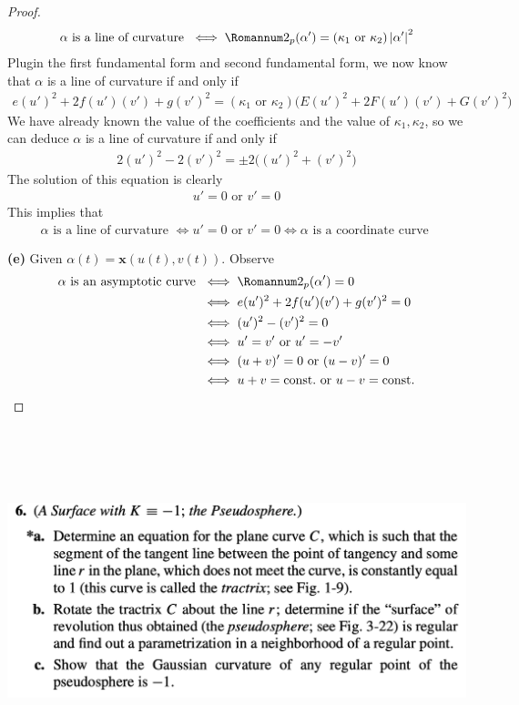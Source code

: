 \documentclass{report}
\begin{document}
\begin{proof}
\begin{align*}
\alpha \text{ is a line of  curvature }\iff \Sec_p(\alpha ')= (\kappa_1\text{ or }\kappa_2) \abso{\alpha '}^2
\end{align*}
Plugin the first fundamental form and second fundamental form, we now know that $\alpha $ is a line of curvature if and only if 
\begin{align*}
e(u')^2 + 2f(u')(v')+ g (v')^2 = (\kappa_1\text{ or }\kappa_2) \big(E(u')^2 +2F(u')(v')+ G(v')^2 \big)
\end{align*}
We have already known the value of the coefficients and the value of $\kappa_1,\kappa_2$, so we can deduce $\alpha $ is a line of curvature if and only if 
\begin{align*}
  2(u')^2 -2 (v')^2 = \pm 2 \big((u')^2 +(v')^2 \big)
\end{align*}
The solution of this equation is clearly 
\begin{align*}
u'=0\text{ or }v'=0
\end{align*}
This implies that
\begin{align*}
\alpha \text{ is a line of curvature }\iff u'=0\text{ or } v'=0\iff \alpha \text{ is a coordinate curve }
\end{align*}




\textbf{(e)} Given $\alpha (t)=\textbf{x}(u(t),v(t))$. Observe
\begin{align*}
  \alpha \text{ is an asymptotic curve }&\iff \Sec_p(\alpha ')=0\\
  &\iff  e(u')^2 +2f (u')(v')+ g(v')^2=0\\
  &\iff (u')^2-(v')^2=0 \\
  &\iff u'=v'\text{ or }u'=-v' \\
  &\iff (u+v)'=0\text{ or }(u-v)'=0\\
  &\iff u+v=\text{const.}\text{ or }u-v=\text{const.}
\end{align*}


\end{proof}
\begin{question}{}{}
\includegraphics[height=10cm,width=18cm]{hw5q9}
\end{question}
\end{document}
